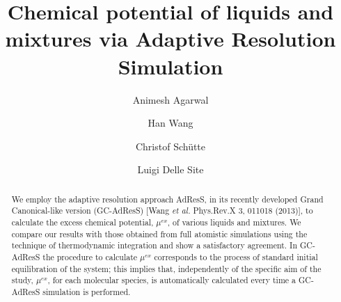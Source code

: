\documentclass[a4paper,preprint,unsortedaddress]{revtex4-1}
\begin{document}
\title{Chemical potential of liquids and mixtures via Adaptive Resolution Simulation}
\author{Animesh Agarwal}
\author{Han Wang}
\author{Christof Sch\"{u}tte}
\author{Luigi Delle Site}


\begin{abstract}
We employ the adaptive resolution approach AdResS, in its recently developed Grand Canonical-like version (GC-AdResS) [Wang {\it et al.} Phys.Rev.X 3, 011018 (2013)], to calculate the excess chemical potential, $\mu^{ex}$, of various liquids and mixtures.
We compare our results with those obtained from full atomistic simulations using the technique of thermodynamic integration and show a satisfactory agreement. In GC-AdResS the procedure to calculate $\mu^{ex}$ corresponds to the process of standard initial equilibration of the system; this implies that, independently of the specific aim of the study, $\mu^{ex}$, for each molecular species, is automatically calculated every time a GC-AdResS simulation is performed. 
\end{abstract}

\maketitle
\end{document}
